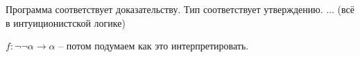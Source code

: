 \begin{definition}
    Программа соответствует доказательству.
    Тип соответствует утверждению. ...
    (всё в интуиционистской логике)
\end{definition}

\begin{note}
    $f: \neg\neg \alpha \to \alpha $ -- потом подумаем как это интерпретировать.
\end{note}

\endinput
